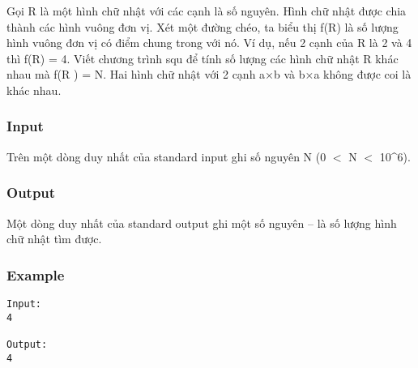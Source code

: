 



   Gọi R là một hình chữ nhật với các cạnh là số nguyên. Hình chữ nhật được chia thành các hình vuông đơn vị. Xét một đường chéo, ta biểu thị f(R) là số lượng hình vuông đơn vị có điểm chung trong với nó. Ví dụ, nếu 2 cạnh của R là 2 và 4 thì f(R) = 4. Viết chương trình squ để tính số lượng các hình chữ nhật R khác nhau mà f(R ) = N. Hai hình chữ nhật với 2 cạnh a×b và b×a không được coi là khác nhau.  

\subsubsection{   Input  }

   Trên một dòng duy nhất của standard input ghi số nguyên N (0 $<$ N $<$ 10^6).  

\subsubsection{   Output  }

   Một dòng duy nhất của standard output ghi một số nguyên – là số lượng hình chữ nhật tìm được.  

\subsubsection{   Example  }
\begin{verbatim}
Input:
4

Output:
4
\end{verbatim}

